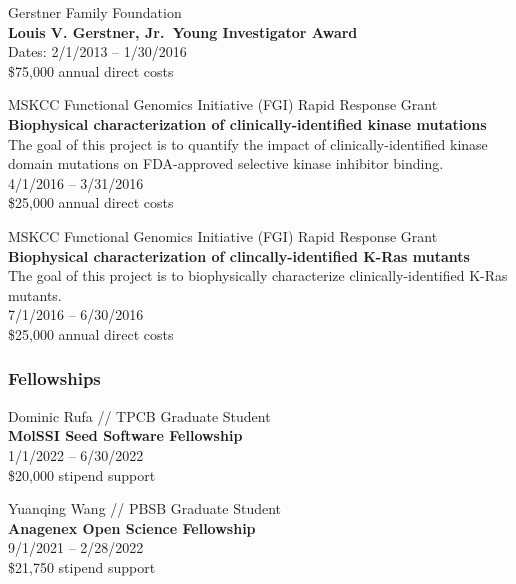 \documentclass[10pt]{article}
\begin{document}
\vspace{1.5ex}

Gerstner Family Foundation \\
{\bf Louis V. Gerstner, Jr.~Young Investigator Award} \\
Dates: 2/1/2013 -- 1/30/2016 \\
\$75,000 annual direct costs

\vspace{1.5ex}

MSKCC Functional Genomics Initiative (FGI) Rapid Response Grant \\
{\bf Biophysical characterization of clinically-identified kinase mutations} \\
The goal of this project is to quantify the impact of clinically-identified kinase domain mutations on FDA-approved selective kinase inhibitor binding. \\
4/1/2016 -- 3/31/2016 \\
\$25,000 annual direct costs

\vspace{1.5ex}

MSKCC Functional Genomics Initiative (FGI) Rapid Response Grant \\
{\bf Biophysical characterization of clincally-identified K-Ras mutants} \\
The goal of this project is to biophysically characterize clinically-identified K-Ras mutants. \\
7/1/2016 -- 6/30/2016 \\
\$25,000 annual direct costs

\subsubsection*{Fellowships}

Dominic Rufa // TPCB Graduate Student\\
{\bf MolSSI Seed Software Fellowship}\\
1/1/2022 -- 6/30/2022\\
\$20,000 stipend support

\vspace{1.5ex} 

Yuanqing Wang // PBSB Graduate Student\\
{\bf Anagenex Open Science Fellowship}\\
9/1/2021 -- 2/28/2022\\
\$21,750 stipend support

\vspace{1.5ex} 
\end{document}
